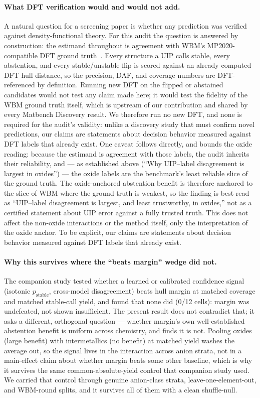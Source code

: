 \documentclass[11pt]{article}
\begin{document}
\paragraph{What DFT verification would and would not add.} A natural question for a screening
paper is whether any prediction was verified against density-functional theory. For this audit the
question is answered by construction: the estimand throughout is agreement with WBM's
MP2020-compatible DFT ground truth~\citep{wang2021mp2020,riebesell2025}. Every structure a UIP
calls stable, every abstention, and every stable/unstable flip is scored against an
already-computed DFT hull distance, so the precision, DAF, and coverage numbers are
DFT-referenced by definition. Running new DFT on the flipped or abstained candidates would not
test any claim made here; it would test the fidelity of the WBM ground truth itself, which is
upstream of our contribution and shared by every Matbench Discovery result. We therefore run no
new DFT, and none is required for the audit's validity: unlike a discovery study that must confirm
novel predictions, our claims are statements about decision behavior measured against DFT labels
that already exist. One caveat follows directly, and bounds the oxide reading: because the
estimand is agreement with those labels, the audit inherits their reliability, and --- as
established above (``Why UIP--label disagreement is largest in oxides'') --- the oxide labels are
the benchmark's least reliable slice of the ground truth. The oxide-anchored abstention benefit is therefore anchored to the slice of
WBM where the ground truth is weakest, so the finding is best read as ``UIP--label disagreement is
largest, and least trustworthy, in oxides,'' not as a certified statement about UIP error against
a fully trusted truth. This does not affect the non-oxide interactions or the method itself, only
the interpretation of the oxide anchor. To be explicit, our claims are statements about decision
behavior measured against DFT labels
that already exist.

\paragraph{Why this survives where the ``beats margin'' wedge did not.} The companion study
tested whether a learned or calibrated confidence signal (isotonic $p_{\mathrm{stable}}$,
cross-model disagreement) beats hull margin at matched coverage and matched stable-call
yield, and found that none did (0/12 cells): margin was undefeated, not shown insufficient. The
present result does not contradict that; it asks a different, orthogonal question --- whether
margin's own well-established abstention benefit is uniform across chemistry, and finds it is
not. Pooling oxides (large benefit) with intermetallics (no benefit) at matched yield washes
the average out, so the signal lives in the interaction across anion strata, not in a
main-effect claim about whether margin beats some other baseline, which is why it survives
the same common-absolute-yield control that companion study used. We carried that control
through genuine anion-class strata, leave-one-element-out, and WBM-round splits, and it survives
all of them with a clean shuffle-null.
\end{document}
